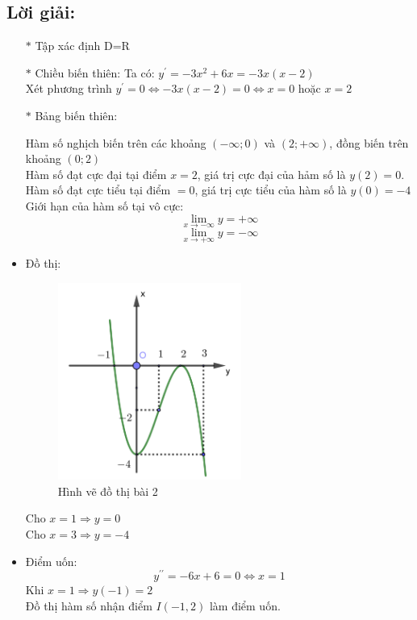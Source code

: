\documentclass[13pt, a4paper, titlepage]{report}
\begin{document}
\subsection*{Lời giải:}
\begin{itemize}
\item[$\ast$] Tập xác định D=R
\item[$\ast$] Chiều biến thiên:
Ta có: $y^{\prime} = -3x^2 + 6x = -3x(x-2)$ \\
Xét phương trình $y^{\prime} = 0 \Leftrightarrow -3x(x-2) = 0 \Leftrightarrow x = 0$ hoặc $x = 2$
\item[$\ast$] Bảng biến thiên:
	\begin{figure}[H]
		\centering
	\end{figure}
	Hàm số nghịch biến trên các khoảng $(-\infty; 0)$ và $(2; +\infty)$, đồng biến trên khoảng $(0; 2)$ \\
	Hàm số đạt cực đại tại điểm $x=2$, giá trị cực đại của hảm số là $y(2)=0$. \\
	Hàm số đạt cực tiểu tại điểm $=0$, giá trị cực tiểu của hàm số là $y(0)=-4$ \\
	Giới hạn của hàm số tại vô cực: 
	$$\lim_{x \to -\infty}{y} = +\infty$$
	$$\lim_{x \to +\infty}{y} = -\infty$$
\item Đồ thị:
	\begin{figure}[H]
		\centering
		\includegraphics[width=6cm]{images/quizz2/quizz_2_figure.png}
		\caption{Hình vẽ đồ thị bài 2}
	\end{figure}
	Cho $x = 1 \Rightarrow y = 0$ \\
	Cho $x = 3 \Rightarrow y = -4$
\item Điểm uốn:
	$$y^{\prime\prime} = -6x + 6 = 0 \Leftrightarrow x = 1$$
	Khi $x = 1 \Rightarrow y(-1) = 2$ \\
	Đồ thị hàm số nhận điểm $I(-1, 2)$ làm điểm uốn. 
\end{itemize}
\end{document}
